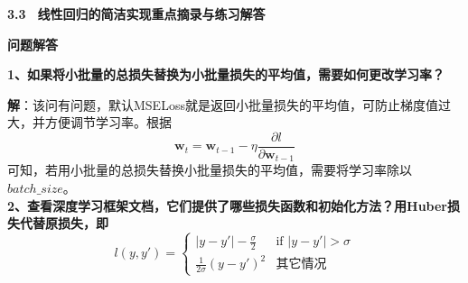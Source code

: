 \documentclass[UTF8]{ctexart}
\begin{document}
	\setlength{\abovedisplayskip}{2pt}
	\setlength{\belowdisplayskip}{2pt}
	\setlength{\abovedisplayshortskip}{2pt}
	\setlength{\belowdisplayshortskip}{2pt}
	\begin{center}
		\heiti{}\textbf{3.3 \, 线性回归的简洁实现重点摘录与练习解答} %
		\vspace{2ex}
	\end{center}
	
	
	\pagestyle{fancy}
	\lhead{}
	\chead{}
	\rhead{}
	\cfoot{\thepage}
	\renewcommand{\headrulewidth}{0pt}
	\renewcommand{\footrulewidth}{0pt} %
	
	
	\textbf{问题解答}
	
	\textbf{1、如果将小批量的总损失替换为小批量损失的平均值，需要如何更改学习率？}
	
	\noindent \textbf{解}：该问有问题，默认MSELoss就是返回小批量损失的平均值，可防止梯度值过大，并方便调节学习率。根据
	\[
	\bm{w}_t = \bm{w}_{t-1} - \eta \frac{\partial l}{\partial \bm{w}_{t-1}}
	\]
	可知，若用小批量的总损失替换小批量损失的平均值，需要将学习率除以 $batch\_size$。\\
	
	\textbf{2、查看深度学习框架文档，它们提供了哪些损失函数和初始化方法？用Huber损失代替原损失，即}
    \[
    l(y, y') = 
    \begin{cases} 
    	|y - y'| - \frac{\sigma}{2} & \text{if } |y - y'| > \sigma \\
    	\frac{1}{2\sigma}(y - y')^2 & \text{其它情况}
    \end{cases}
    \]
    
\end{document}
